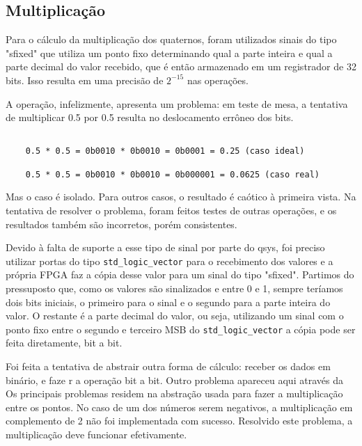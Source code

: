 \documentclass [12pt,oneside] {article}
\begin{document}
\subsection{Multiplicação}

	Para o cálculo da multiplicação dos quaternos, foram
utilizados sinais do tipo "sfixed" que utiliza um ponto fixo
determinando qual a parte inteira e qual a parte decimal do valor
recebido, que é então armazenado em um registrador de 32 bits. Isso
resulta em uma precisão de $2^{-15}$ nas operações.

	A operação, infelizmente, apresenta um problema: em teste de
mesa, a tentativa de multiplicar 0.5 por 0.5 resulta no deslocamento
errôneo dos bits.

\begin{footnotesize} \begin{verbatim}

	0.5 * 0.5 = 0b0010 * 0b0010 = 0b0001 = 0.25 (caso ideal)

	0.5 * 0.5 = 0b0010 * 0b0010 = 0b000001 = 0.0625 (caso real)

\end{verbatim} \end{footnotesize}

Mas o caso é isolado. Para outros casos, o resultado é caótico à
primeira vista. Na tentativa de resolver o problema, foram feitos
testes de outras operações, e os resultados também são incorretos,
porém consistentes.

	Devido à falta de suporte a esse tipo de sinal por parte do
qsys, foi preciso utilizar portas do tipo \texttt{std\_logic\_vector}
para o recebimento dos valores e a própria FPGA faz a cópia desse
valor para um sinal do tipo "sfixed". Partimos do pressuposto que,
como os valores são sinalizados e entre 0 e 1, sempre teríamos dois
bits iniciais, o primeiro para o sinal e o segundo para a parte
inteira do valor. O restante é a parte decimal do valor, ou seja,
utilizando um sinal com o ponto fixo entre o segundo e terceiro MSB do
\texttt{std\_logic\_vector} a cópia pode ser feita diretamente, bit a
bit.

	Foi feita a tentativa de abstrair outra forma de cálculo:
receber os dados em binário, e faze r a operação bit a bit. Outro
problema apareceu aqui através da  Os principais problemas residem na
abstração usada para fazer a multiplicação entre os pontos. No caso de
um dos números serem negativos, a multiplicação em complemento de 2
não foi implementada com sucesso. Resolvido este problema, a
multiplicação deve funcionar efetivamente.
\end{document}
